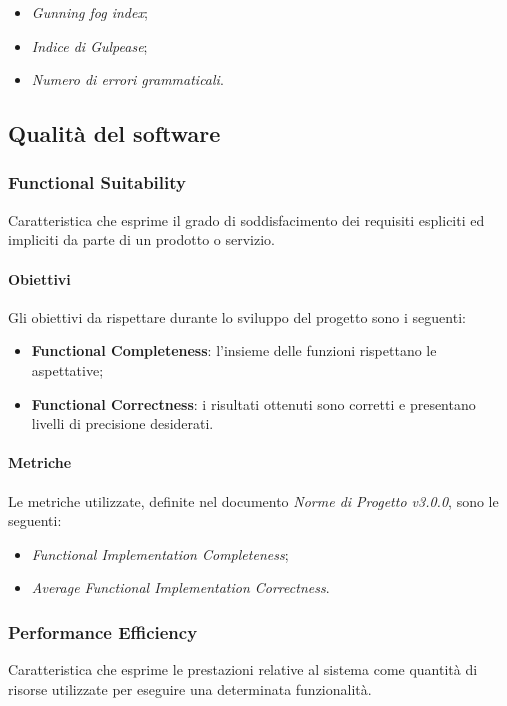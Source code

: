 \begin{itemize}
		\item{\emph{Gunning fog index};}
		\item{\emph{Indice di Gulpease};}
		\item{\emph{Numero di errori grammaticali}.}
\end{itemize}

\subsection{Qualità del software}
\subsubsection{Functional Suitability}
	Caratteristica che esprime il grado di soddisfacimento dei requisiti espliciti ed impliciti da parte di un prodotto o servizio. 
\paragraph{Obiettivi}\Spazio
Gli obiettivi da rispettare durante lo sviluppo del progetto sono i seguenti:
	\begin{itemize}
			\item{\textbf{Functional Completeness}: l'insieme delle funzioni rispettano le aspettative;
			}
			\item{\textbf{Functional Correctness}: i risultati ottenuti sono corretti e presentano livelli di precisione desiderati.
			}
	\end{itemize}

\paragraph{Metriche} \Spazio
Le metriche utilizzate, definite nel documento \emph{Norme di Progetto v3.0.0}, sono le seguenti:
	\begin{itemize}
		\item{\emph{Functional Implementation Completeness};}
		\item{\emph{Average Functional Implementation Correctness}.}
	\end{itemize}

\subsubsection{Performance Efficiency}
	Caratteristica che esprime le prestazioni relative al sistema come quantità di risorse utilizzate per eseguire una determinata funzionalità. 
